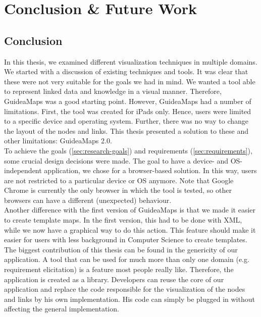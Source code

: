\chapter{Conclusion \& Future Work}\label{ch:conclusion-future-work}

\section{Conclusion}\label{sec:conclusion}
In this thesis, we examined different visualization techniques in multiple domains. We started with a discussion of existing techniques and tools. It was clear that these were not very suitable for the goals we had in mind. We wanted a tool able to represent linked data and knowledge in a visual manner. Therefore, GuideaMaps was a good starting point. However, GuideaMaps had a number of limitations. First, the tool was created for iPads only. Hence, users were limited to a specific device and operating system. Further, there was no way to change the layout of the nodes and links. This thesis presented a solution to these and other limitations: GuideaMaps 2.0.\\

To achieve the goals (\autoref{sec:research-goals}) and requirements (\autoref{sec:requirements}), some crucial design decisions were made. The goal to have a device- and OS-independent application, we chose for a browser-based solution. In this way, users are not restricted to a particular device or OS anymore. Note that Google Chrome is currently the only browser in which the tool is tested, so other browsers can have a different (unexpected) behaviour.\\

Another difference with the first version of GuideaMaps is that we made it easier to create template maps. In the first version, this had to be done with XML, while we now have a graphical way to do this action. This feature should make it easier for users with less background in Computer Science to create templates.\\

The biggest contribution of this thesis can be found in the genericity of our application. A tool that can be used for much more than only one domain (e.g. requirement elicitation) is a feature most people really like. Therefore, the application is created as a library. Developers can reuse the core of our application and replace the code responsible for the visualization of the nodes and links by his own implementation. His code can simply be plugged in without affecting the general implementation.\\

